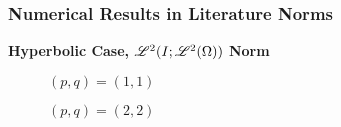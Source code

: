 \begin{frame}
    \frametitle{Numerical Results in Literature Norms}

    \vspace*{\fill}
    \begin{center}
        {\color{\accentcolor} \Large \textbf{Hyperbolic Case, $\mathscr{L}^{2}(I; \mathscr{L}^{2}(\Omega))$ Norm}}
    \end{center}

    \vspace*{\fill}

    \begin{multicols}{2}

        \begin{center}
            \begin{minipage}{0.4\textwidth}
                \begin{figure}[!ht]
                    \caption{$\left( p, q  \right) = \left( 1, 1  \right)$}
                    \label{fig:p_1_1_hyp_l2l2}
                    
                \end{figure}
            \end{minipage}
        \end{center}

        \vfill\null
        \columnbreak

        \begin{center}
            \begin{minipage}{0.4\textwidth}
                \begin{figure}[!ht]
                    \caption{$\left( p, q  \right) = \left( 2, 2  \right)$}
                    \label{fig:p_2_2_hyp_l2l2}
                    
                \end{figure}
            \end{minipage}
        \end{center}

    \end{multicols}
    \vspace*{\fill}
    
\end{frame}


